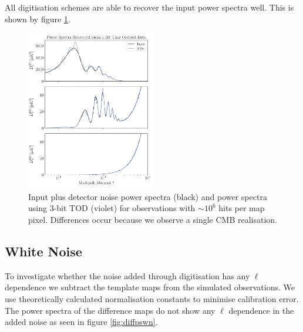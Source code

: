 \documentclass[apj]{emulateapj}
\begin{document}
All digitisation schemes are able to recover the input power spectra well. This is shown by figure \ref{fig:psrecover}.


\begin{figure}[htb]\centering
\includegraphics[width=0.5\textwidth,clip]{Plots/psrecovery.pdf}
  \caption[Current ]{
  Input plus detector noise power spectra (black) and power spectra using 3-bit TOD (violet) for observations with $\sim 10^6$ hits per map pixel. Differences occur because we observe a single CMB realisation.
\label{fig:psrecover}
}
\end{figure}

\subsection{White Noise}
\label{subsec:whitenoise}

To investigate whether the noise added through digitisation has any $\ell$ dependence we subtract the template maps from the simulated observations. We use theoretically calculated normalisation constants to minimise calibration error. The power spectra of the difference maps do not show any $\ell$ dependence in the added noise as seen in figure \ref{fig:diffpswn}. %
\end{document}
